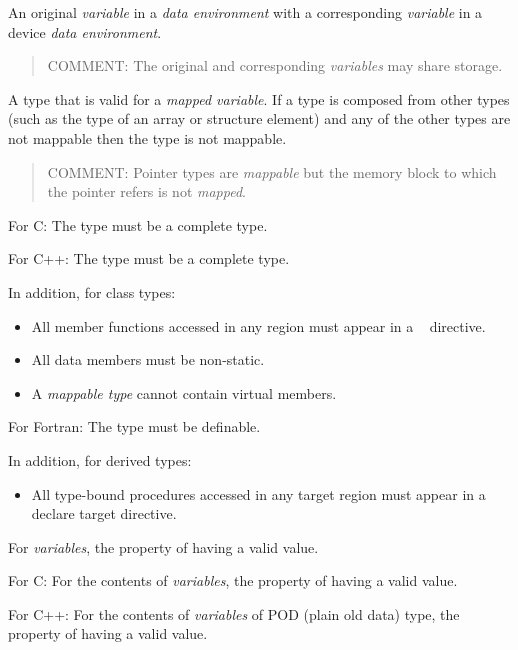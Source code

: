 \glossarydefstart
An original \emph{variable} in a \emph{data environment} with a corresponding \emph{variable} in a 
device \emph{data environment}.

\begin{quote}
COMMENT: The original and corresponding \emph{variables} may share storage.
\end{quote}
\glossarydefend

\glossarydefstart
A type that is valid for a \emph{mapped variable}. If a type is composed from other types 
(such as the type of an array or structure element) and any of the other types are 
not mappable then the type is not mappable.

\begin{quote}
COMMENT: Pointer types are \emph{mappable} but the memory block to which the pointer refers is not \emph{mapped}.
\end{quote}

For C: 
\nopagebreak
The type must be a complete type.

For C++: 
\nopagebreak
The type must be a complete type.

In addition, for class types:
\begin{itemize}
\item All member functions accessed in any  region must appear in a 
~ directive.

\item All data members must be non-static.

\item A \emph{mappable type} cannot contain virtual members. 
\end{itemize}

For Fortran: 
\nopagebreak
The type must be definable.

In addition, for derived types:

\begin{itemize}
\item All type-bound procedures accessed in any target region must appear in a declare target directive.
\end{itemize}
\glossarydefend

\glossarydefstart
For \emph{variables}, the property of having a valid value.

For C:
\nopagebreak
For the contents of \emph{variables}, the property of having a valid value.

For C++: 
\nopagebreak
For the contents of \emph{variables} of POD (plain old data) type, the property of having 
a valid value.


